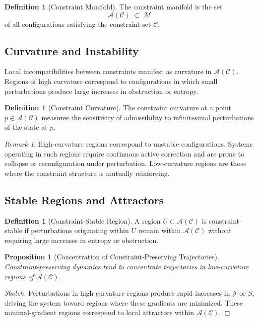 \documentclass[11pt]{article}
\theoremstyle{plain}
\newtheorem{proposition}[theorem]{Proposition}
\theoremstyle{definition}
\newtheorem{definition}[theorem]{Definition}
\theoremstyle{remark}
\newtheorem{remark}[theorem]{Remark}
\newcommand{\Ss}{S}
\begin{document}
\begin{definition}[Constraint Manifold]
The constraint manifold is the set
\[
  \mathcal{A}(\mathcal{C}) \;\subset\; \mathcal{M}
\]
of all configurations satisfying the constraint set $\mathcal{C}$.
\end{definition}

\subsection{Curvature and Instability}

Local incompatibilities between constraints manifest as curvature in
$\mathcal{A}(\mathcal{C})$. Regions of high curvature correspond to
configurations in which small perturbations produce large increases in
obstruction or entropy.

\begin{definition}[Constraint Curvature]
The constraint curvature at a point $p \in \mathcal{A}(\mathcal{C})$
measures the sensitivity of admissibility to infinitesimal perturbations
of the state at $p$.
\end{definition}

\begin{remark}
High-curvature regions correspond to unstable configurations. Systems
operating in such regions require continuous active correction and are
prone to collapse or reconfiguration under perturbation. Low-curvature
regions are those where the constraint structure is mutually reinforcing.
\end{remark}

\subsection{Stable Regions and Attractors}

\begin{definition}[Constraint-Stable Region]
A region $U \subset \mathcal{A}(\mathcal{C})$ is constraint-stable if
perturbations originating within $U$ remain within $\mathcal{A}(\mathcal{C})$
without requiring large increases in entropy or obstruction.
\end{definition}

\begin{proposition}[Concentration of Constraint-Preserving Trajectories]
Constraint-preserving dynamics tend to concentrate trajectories in
low-curvature regions of $\mathcal{A}(\mathcal{C})$.
\end{proposition}

\begin{proof}[Sketch]
Perturbations in high-curvature regions produce rapid increases in
$\mathcal{J}$ or $\Ss$, driving the system toward regions where these
gradients are minimized. These minimal-gradient regions correspond to
local attractors within $\mathcal{A}(\mathcal{C})$.
\end{proof}
\end{document}
